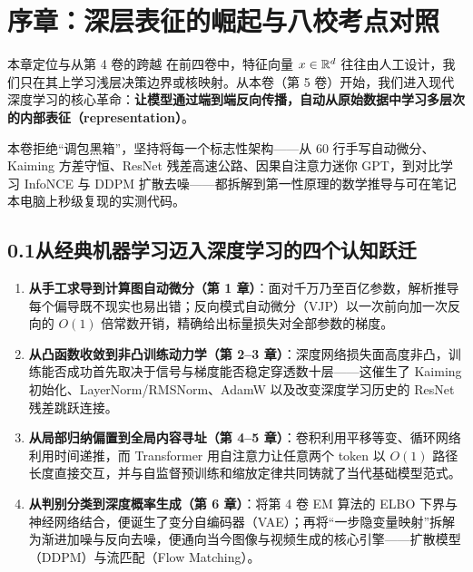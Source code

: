 \chapter*{序章：深层表征的崛起与八校考点对照}


\begin{chapIntro}{本章定位与从第 4 卷的跨越}
在前四卷中，特征向量 $x \in \mathbb{R}^d$ 往往由人工设计，我们只在其上学习浅层决策边界或核映射。从本卷（第 5 卷）开始，我们进入现代深度学习的核心革命：\textbf{让模型通过端到端反向传播，自动从原始数据中学习多层次的内部表征（representation）}。

本卷拒绝“调包黑箱”，坚持将每一个标志性架构——从 60 行手写自动微分、Kaiming 方差守恒、ResNet 残差高速公路、因果自注意力迷你 GPT，到对比学习 InfoNCE 与 DDPM 扩散去噪——都拆解到第一性原理的数学推导与可在笔记本电脑上秒级复现的实测代码。
\end{chapIntro}

\section*{0.1\quad 从经典机器学习迈入深度学习的四个认知跃迁}

\begin{enumerate}
  \item \textbf{从手工求导到计算图自动微分（第 1 章）}：面对千万乃至百亿参数，解析推导每个偏导既不现实也易出错；反向模式自动微分（VJP）以一次前向加一次反向的 $O(1)$ 倍常数开销，精确给出标量损失对全部参数的梯度。
  \item \textbf{从凸函数收敛到非凸训练动力学（第 2--3 章）}：深度网络损失面高度非凸，训练能否成功首先取决于信号与梯度能否稳定穿透数十层——这催生了 Kaiming 初始化、LayerNorm/RMSNorm、AdamW 以及改变深度学习历史的 ResNet 残差跳跃连接。
  \item \textbf{从局部归纳偏置到全局内容寻址（第 4--5 章）}：卷积利用平移等变、循环网络利用时间递推，而 Transformer 用自注意力让任意两个 token 以 $O(1)$ 路径长度直接交互，并与自监督预训练和缩放定律共同铸就了当代基础模型范式。
  \item \textbf{从判别分类到深度概率生成（第 6 章）}：将第 4 卷 EM 算法的 ELBO 下界与神经网络结合，便诞生了变分自编码器（VAE）；再将“一步隐变量映射”拆解为渐进加噪与反向去噪，便通向当今图像与视频生成的核心引擎——扩散模型（DDPM）与流匹配（Flow Matching）。
\end{enumerate}


